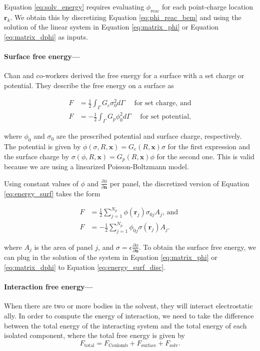 Equation \eqref{eq:solv_energy} requires evaluating $\phi_{\text{reac}}$ for each point-charge location $\mathbf{r}_k$. We obtain this by discretizing Equation \eqref{eq:phi_reac_bem} and using the solution of the linear system in Equation \eqref{eq:matrix_phi} or Equation \eqref{eq:matrix_dphi} as inputs.

\medskip
\paragraph*{Surface free energy---}

Chan and co-workers \cite{ChanMitchell1983,CarnieChan1993} derived the free energy for a surface with a set charge or potential. They describe the free energy on a surface as

\begin{align} \label{eq:energy_surf}
F &= \frac{1}{2} \int_{\Gamma} G_c \sigma_0^2 d\Gamma \quad \text{ for set charge, and} \nonumber \\
F &= -\frac{1}{2} \int_{\Gamma} G_p \phi_0^2 d\Gamma \quad \text{ for set potential,}
\end{align} 

\noindent where $\phi_0$ and $\sigma_0$ are the prescribed potential and surface charge, respectively. The potential is given by $\phi(\sigma, R, \mathbf{x}) = G_c(R, \mathbf{x}) \sigma$ for the first expression and the surface charge by $\sigma(\phi, R, \mathbf{x}) = G_p(R, \mathbf{x}) \phi$ for the second one. This is valid because we are using a linearized Poisson-Boltzmann model.

Using constant values of $\phi$ and $\frac{\partial \phi}{\partial \mathbf{n}}$ per panel, the discretized version of Equation \eqref{eq:energy_surf} takes the form

\begin{align} \label{eq:energy_surf_disc}
F &= \frac{1}{2} \sum_{j=1}^{N_p} \phi(\mathbf{r}_j) \sigma_{0j} A_j \text{, and } \nonumber \\
F &= -\frac{1}{2} \sum_{j=1}^{N_p} \phi_{0j} \sigma(\mathbf{r}_j) A_j. 
\end{align}

\noindent where $A_j$ is the area of panel $j$, and $\sigma = \epsilon \frac{\partial \phi}{\partial \mathbf{n}}$. To obtain the surface free energy, we can plug in the solution of the system in Equation \eqref{eq:matrix_phi} or \eqref{eq:matrix_dphi} to Equation \eqref{eq:energy_surf_disc}. 

\medskip
\paragraph*{Interaction free energy---}
When there are two or more bodies in the solvent, they will interact electrostatic ally. In order to compute the energy of interaction, we need to take the difference between the total energy of the interacting system and the total energy of each isolated component, where the total free energy is given by
%
\begin{equation} \label{eq:total_energy}
F_{\text{total}} = F_{\text{Coulomb}} + F_{\text{surface}} + F_{\text{solv}}.
\end{equation}

